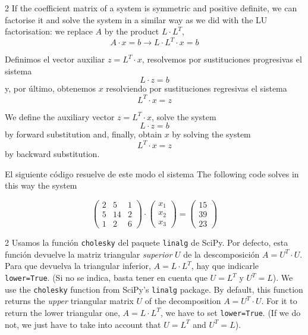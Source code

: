\begin{paracol}{2}
If the coefficient matrix of a system is symmetric and positive definite, we can factorise it and solve the system in a similar way as we did with the LU factorisation: we replace $A$ by the product $L\cdot L^T$,
\begin{equation*}
A\cdot x = b \rightarrow L\cdot L^T\cdot x= b
\end{equation*}

\switchcolumn
Definimos el vector auxiliar $z=L^T\cdot x$, resolvemos por sustituciones progresivas el sistema
\begin{equation*}
L\cdot z=b
\end{equation*}
y, por último, obtenemos $x$ resolviendo por sustituciones regresivas el sistema
\begin{equation*}
L^T\cdot x=z
\end{equation*}

\switchcolumn
We define the auxiliary vector $z=L^T\cdot x$, solve the system
\begin{equation*}
L\cdot z=b
\end{equation*}
by forward substitution and, finally, obtain $x$ by solving the system
\begin{equation*}
L^T\cdot x=z
\end{equation*}
by backward substitution.

\switchcolumn
El siguiente código resuelve de este modo el sistema
\switchcolumn
The following code solves in this way the system
\end{paracol}
\begin{equation*}
\begin{pmatrix}
2& 5& 1\\
5& 14& 2\\
1& 2& 6
\end{pmatrix}\cdot \begin{pmatrix}
x_1\\
x_2\\
x_3
\end{pmatrix}=\begin{pmatrix}
15\\
39\\
23
\end{pmatrix}
\end{equation*}

\begin{paracol}{2}
Usamos la función \texttt{cholesky} del paquete \texttt{linalg} de SciPy. Por defecto, esta función devuelve la matriz triangular \emph{superior} $U$ de la descomposición $A=U^T\cdot U$. Para que devuelva la triangular inferior, $A=L\cdot L^T$, hay que indicarle \texttt{lower=True}. (Si no se indica, basta tener en cuenta que $U=L^T$ y $U^T=L$).
\switchcolumn
We use the \texttt{cholesky} function from SciPy's \texttt{linalg} package. By default, this function returns the \emph{upper} triangular matrix $U$ of the decomposition $A=U^T\cdot U$. For it to return the lower triangular one, $A=L \cdot L^T$, we have to set \texttt{lower=True}. (If we do not, we just have to take into account that $U=L^T$ and $U^T=L$).
\end{paracol}

